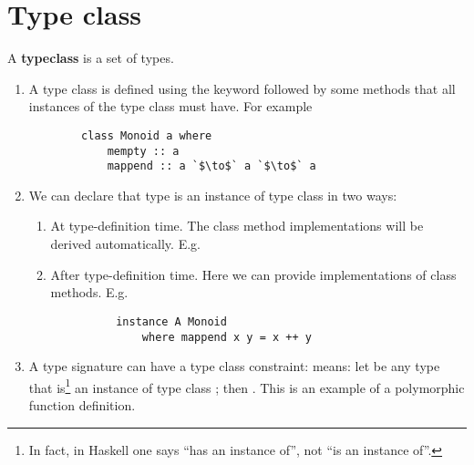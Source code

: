 \documentclass[12pt]{article}
\begin{document}
\section*{Type class}
\begin{definition*}
  A {\bf typeclass} is a set of types.
\end{definition*}

\begin{remark*}\hspace{0pt}
  \begin{enumerate}
  \item A type class is defined using the  keyword followed by some methods that all
    instances of the type class must have. For example
    \begin{normalfont}
      \begin{verbatim}
        class Monoid a where
            mempty :: a
            mappend :: a `$\to$` a `$\to$` a
      \end{verbatim}
    \end{normalfont}
  \item We can declare that type  is an instance of type class  in two ways:
    \begin{enumerate}
    \item At type-definition time. The class method implementations will be derived
      automatically. E.g. 
    \item After type-definition time. Here we can provide implementations of class methods. E.g.
      \begin{normalfont}
        \begin{verbatim}
          instance A Monoid
              where mappend x y = x ++ y
        \end{verbatim}
      \end{normalfont}
    \end{enumerate}
  \item A type signature can have a type class constraint:  means: let
     be any type that is\footnote{In fact, in Haskell one says ``has an instance of'', not
      ``is an instance of''.} an instance of type class ; then . This is an
    example of a polymorphic function definition.
  \end{enumerate}
\end{remark*}
\end{document}
